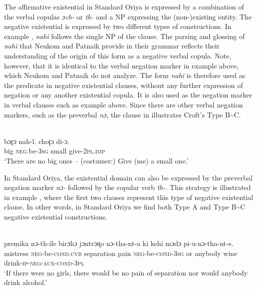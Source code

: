 \documentclass[output=paper,colorlinks,citecolor=brown]{langscibook}
\begin{document}
The affirmative existential in Standard Oriya is expressed by a
combination of the verbal copulas \textit{ɔch-} or \textit{th-} and a NP
expressing the (non-)existing entity. The negative existential is expressed
by two different types of constructions. In example
, \textit{nahĩ} follows the single NP of the
clause. The parsing and glossing of \textit{nahĩ} that Neukom and Patnaik
provide in their grammar reflects their understanding of the origin of this
form as a negative verbal copula.  Note, however, that it is identical to
the verbal negation marker in example  above,
which Neukom and Patnaik do not analyze.  The form \textit{nahĩ} is
therefore used as the predicate in negative existential clauses, without
any further expression of negation or any another existential copula. It is
also used as the negation marker in verbal clauses such as example
 above. Since there are other verbal negation
markers, such as the preverbal \textit{nɔ}, the clause in
 illustrates Croft's Type B{\textasciitilde}C. 
%
\begin{exe}\ex\label{ex:ieur-oriya-nobig}
\\
    \gll bɔɽɔ nah-ĩ. {\textendash}choʈɔ di-ɔ. \\
    big   \textsc{neg}.be-\textsc{3sg}  small give-\textsc{2pl.imp} \\
    \glt `There are no big ones – (costumer:) Give (me) a small one.'
    \end{exe}

In Standard Oriya, the existential domain can also be expressed
by the preverbal negation marker \textit{nɔ-} followed by the copular verb
\textit{th-}. This strategy is illustrated in example
, where the first two clauses represent this type of negative existential clause. In other words, in Standard Oriya we find both Type A and Type B{\textasciitilde}C negative existential constructions. 
%
\begin{exe}\ex\label{ex:ieur-oriya-nogirls}
\\
    \gll premika nɔ-th-ile birɔhɔ jɔntrɔɳo nɔ-tha-nt-a ki kehi mɔdɔ
    pi-u-nɔ-tha-nt-e. \\
mistress \textsc{neg}-be-\textsc{cond.cvb} separation pain
\textsc{neg}-be-\textsc{cond-3sg} or anybody wine
drink-\textsc{ip-neg-aux-cond-3pl} \\
    \glt `If there were no girls, there would be no pain of separation nor
would anybody drink alcohol.'
    \end{exe} 
\end{document}
